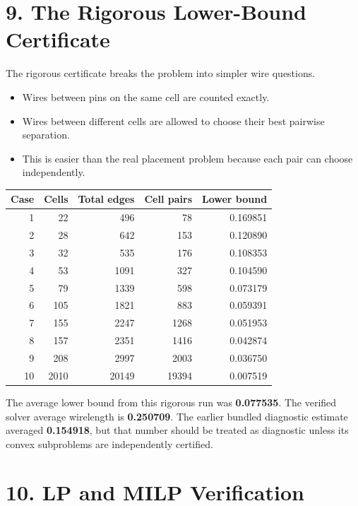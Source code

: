 \documentclass[11pt]{article}
\begin{document}
\section{9. The Rigorous Lower-Bound Certificate}

The rigorous certificate breaks the problem into simpler wire questions.

\begin{itemize}
    \item Wires between pins on the same cell are counted exactly.
    \item Wires between different cells are allowed to choose their best pairwise separation.
    \item This is easier than the real placement problem because each pair can choose independently.
\end{itemize}

\begin{center}
\scriptsize
\begin{tabular}{rrrrr}
\toprule
Case & Cells & Total edges & Cell pairs & Lower bound \\
\midrule
1 & 22 & 496 & 78 & 0.169851 \\
2 & 28 & 642 & 153 & 0.120890 \\
3 & 32 & 535 & 176 & 0.108353 \\
4 & 53 & 1091 & 327 & 0.104590 \\
5 & 79 & 1339 & 598 & 0.073179 \\
6 & 105 & 1821 & 883 & 0.059391 \\
7 & 155 & 2247 & 1268 & 0.051953 \\
8 & 157 & 2351 & 1416 & 0.042874 \\
9 & 208 & 2997 & 2003 & 0.036750 \\
10 & 2010 & 20149 & 19394 & 0.007519 \\
\bottomrule
\end{tabular}
\end{center}

The average lower bound from this rigorous run was \textbf{0.077535}. The verified solver average wirelength is \textbf{0.250709}. The earlier bundled diagnostic estimate averaged \textbf{0.154918}, but that number should be treated as diagnostic unless its convex subproblems are independently certified.

\newpage

\section{10. LP and MILP Verification}
\end{document}
